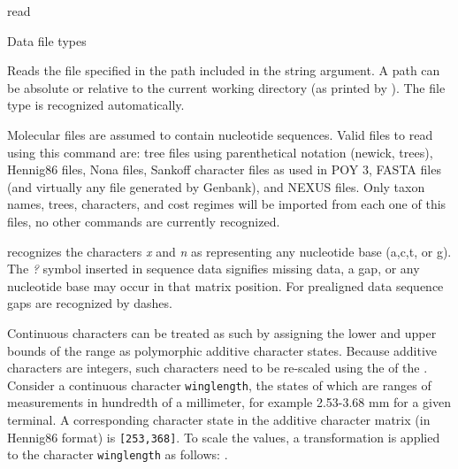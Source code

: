 \begin{command}{read}{}
\begin{arguments}
\begin{argumentgroup}{Data file types}
              {Reads the file specified in the path included in the string argument.
              A path can be absolute or relative to the current
              working directory (as printed by ). The file type
              is recognized automatically.

              Molecular files are assumed to contain nucleotide sequences. Valid
              files to read using this command are: tree files using
              parenthetical notation (newick, \poy trees), Hennig86 files, Nona
              files, Sankoff character files as used in POY 3, FASTA files (and
              virtually any file generated by Genbank), and NEXUS files. Only
              taxon names, trees, characters, and cost regimes will be imported
              from each one of this files, no other commands are currently
              recognized.}
              {}
              
            \begin{statement}
            \poy recognizes the characters \emph{x} and \emph{n} as representing any nucleotide 
            base (a,c,t, or g).  The \emph{?} symbol inserted in sequence data signifies missing data,
            a gap, or any nucleotide base may occur in that matrix position.  
            For prealigned data sequence gaps are recognized by dashes.  
                    \end{statement}

	
	\begin{statement}
            Continuous characters can be treated as such by assigning the lower
            and upper bounds of the range as polymorphic additive character 
            states. Because additive characters are integers, such characters 
            need to be re-scaled using the  of the 
            . Consider a continuous
            character \texttt{winglength}, the states of which are ranges of 
            measurements in hundredth of a millimeter, for example 2.53-3.68 
            mm for a given terminal. A corresponding character state in the 
            additive character matrix (in Hennig86 format) is \texttt{[253,368]}. 
            To scale the values, a transformation is applied to the character 
            \texttt{winglength} as follows:
            .
	\end{statement}
	

\end{argumentgroup}
\end{arguments}
\end{command}
